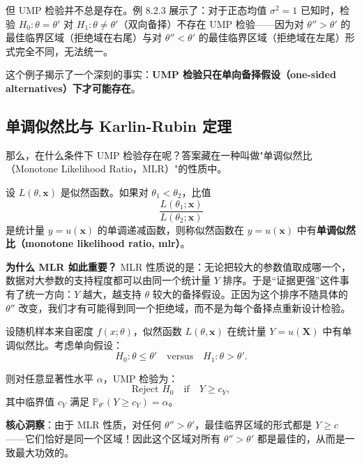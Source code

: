 但 UMP 检验并不总是存在。例 8.2.3 展示了：对于正态均值 $\sigma^2 = 1$ 已知时，检验 $H_0: \theta = \theta'$ 对 $H_1: \theta \neq \theta'$（双向备择）不存在 UMP 检验——因为对 $\theta'' > \theta'$ 的最佳临界区域（拒绝域在右尾）与对 $\theta'' < \theta'$ 的最佳临界区域（拒绝域在左尾）形式完全不同，无法统一。

这个例子揭示了一个深刻的事实：\textbf{UMP 检验只在单向备择假设（one-sided alternatives）下才可能存在}。

\subsection{单调似然比与 Karlin-Rubin 定理}

那么，在什么条件下 UMP 检验存在呢？答案藏在一种叫做"单调似然比（Monotone Likelihood Ratio，MLR）"的性质中。

\begin{definition}[单调似然比]\label{def:mlr}
设 $L(\theta, \mathbf{x})$ 是似然函数。如果对 $\theta_1 < \theta_2$，比值
\[
\frac{L(\theta_1; \mathbf{x})}{L(\theta_2; \mathbf{x})}
\]
是统计量 $y = u(\mathbf{x})$ 的单调递减函数，则称似然函数在 $y = u(\mathbf{x})$ 中有\textbf{单调似然比（monotone likelihood ratio, mlr）}。
\end{definition}

\textbf{为什么 MLR 如此重要？} MLR 性质说的是：无论把较大的参数值取成哪一个，数据对大参数的支持程度都可以由同一个统计量 $Y$ 排序。于是``证据更强''这件事有了统一方向：$Y$ 越大，越支持 $\theta$ 较大的备择假设。正因为这个排序不随具体的 $\theta''$ 改变，我们才有可能得到同一个拒绝域，而不是为每个备择点重新设计检验。

\begin{theorem}\label{th:karlin-rubin}
设随机样本来自密度 $f(x;\theta)$，似然函数 $L(\theta, \mathbf{x})$ 在统计量 $Y = u(\mathbf{X})$ 中有单调似然比。考虑单向假设：
\[
H_0: \theta \leq \theta' \quad \text{versus} \quad H_1: \theta > \theta'.
\]

则对任意显著性水平 $\alpha$，UMP 检验为：
\[
\text{Reject } H_0 \quad \text{if} \quad Y \geq c_Y,
\]
其中临界值 $c_Y$ 满足 $\mathbb{P}_{\theta'}(Y \geq c_Y) = \alpha$。
\end{theorem}

\textbf{核心洞察}：由于 MLR 性质，对任何 $\theta'' > \theta'$，最佳临界区域的形式都是 $Y \geq c$——它们恰好是同一个区域！因此这个区域对所有 $\theta'' > \theta'$ 都是最佳的，从而是一致最大功效的。

